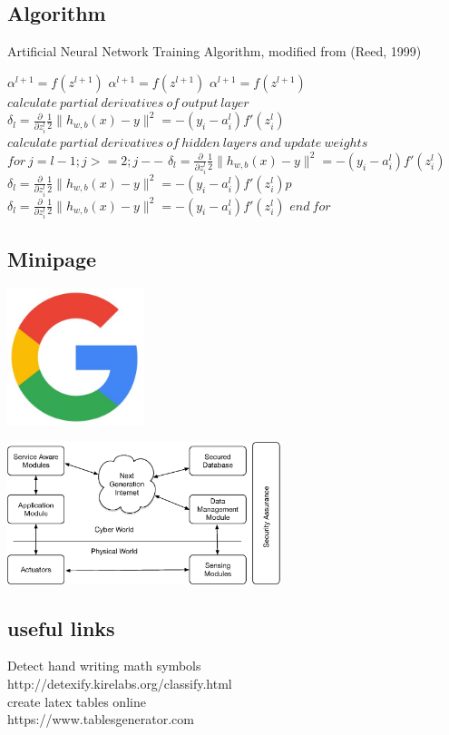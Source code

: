 \documentclass{article}
\begin{document}
\subsection{Algorithm}
\begin{algorithm}
    \caption{Artificial Neural Network Training Algorithm, modified from (Reed, 1999)}\label{euclid}
    \begin{algorithmic}[1]
    \State $\alpha^{l+1}=f(z^{l+1})$
    \State $\alpha^{l+1}=f(z^{l+1})$
    \EndProcedure
    \State $\alpha^{l+1}=f(z^{l+1})$
    \EndProcedure
    \State $calculate~partial ~derivatives~ of~ output~ layer$
    \State $\delta_l=\frac{\partial}{\partial z_i^l}\frac{1}{2} \|h_{w,b}(x)-y\|^2=-(y_i-a_i^l)f'(z_i^l)$
    \State $calculate ~partial~ derivatives~ of~ hidden~ layers~and~update~weights$
    \State $for ~j=l-1;j>=2;j--$
    \State $\delta_l=\frac{\partial}{\partial z_i^l}\frac{1}{2} \|h_{w,b}(x)-y\|^2=-(y_i-a_i^l)f'(z_i^l)$
    \State $\delta_l=\frac{\partial}{\partial z_i^l}\frac{1}{2} \|h_{w,b}(x)-y\|^2=-(y_i-a_i^l)f'(z_i^l)p $
    \State $\delta_l=\frac{\partial}{\partial z_i^l}\frac{1}{2} \|h_{w,b}(x)-y\|^2=-(y_i-a_i^l)f'(z_i^l)$
    \State $end ~for$
    \EndProcedure
    \end{algorithmic}
    \end{algorithm}
\subsection{Minipage}
\begin{minipage}{.5\textwidth}
        \includegraphics[width=4cm]{gg}
        \label{fig:gg}
  \end{minipage}%
  \begin{minipage}{.5\textwidth}
        \includegraphics[width=8cm]{cps}
        \label{fig:svg}
  \end{minipage}
\subsection{useful links}
Detect hand writing math symbols\\
http://detexify.kirelabs.org/classify.html\\
create latex tables online\\
https://www.tablesgenerator.com



     
\end{document}
